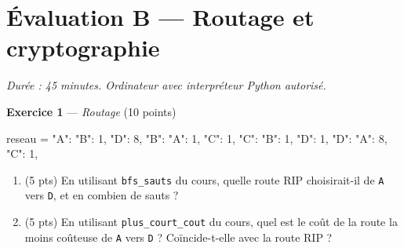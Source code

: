 \section*{Évaluation B --- Routage et cryptographie}
\textit{Durée : 45 minutes. Ordinateur avec interpréteur Python autorisé.}


\bigskip

\textbf{Exercice 1} --- \textit{Routage} \hfill (10 points)

\begin{python}
reseau = {
    "A": {"B": 1, "D": 8},
    "B": {"A": 1, "C": 1},
    "C": {"B": 1, "D": 1},
    "D": {"A": 8, "C": 1},
}
\end{python}
\begin{enumerate}
  \item (5 pts) En utilisant \lstinline{bfs_sauts} du cours, quelle route RIP choisirait-il de \texttt{A} vers \texttt{D}, et en combien de sauts ?
  \item (5 pts) En utilisant \lstinline{plus_court_cout} du cours, quel est le coût de la route la moins coûteuse de \texttt{A} vers \texttt{D} ? Coïncide-t-elle avec la route RIP ?
\end{enumerate}


